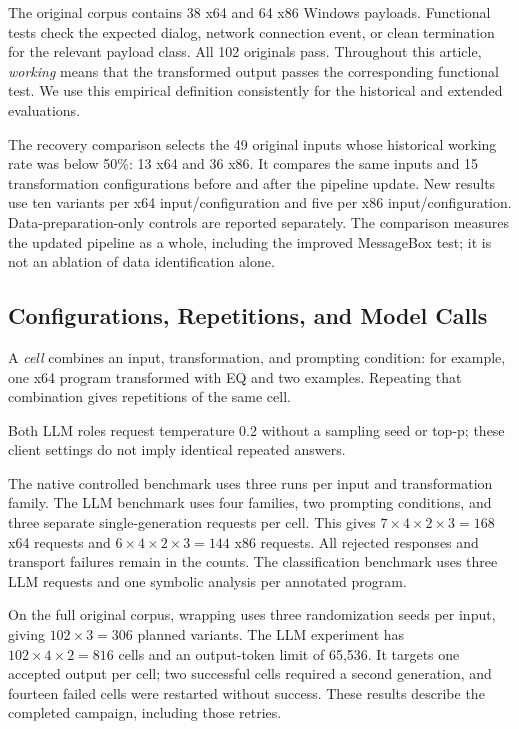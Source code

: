 The original corpus contains 38 x64 and 64 x86 Windows payloads.
Functional tests check the expected dialog, network connection event,
or clean termination for the relevant payload class. All 102 originals pass.
Throughout this article, \emph{working} means that the transformed output
passes the corresponding functional test. We use this empirical definition
consistently for the historical and extended evaluations.

The recovery comparison selects the 49 original inputs whose historical
working rate was below 50\%: 13 x64 and 36 x86. It compares the same
inputs and 15 transformation configurations before and after the
pipeline update. New results use ten variants per x64 input/configuration
and five per x86 input/configuration. Data-preparation-only controls are
reported separately. The comparison measures the updated pipeline as a
whole, including the improved MessageBox test; it is not an ablation of
data identification alone.

\subsection{Configurations, Repetitions, and Model Calls}
A \emph{cell} combines an input, transformation, and prompting condition:
for example, one x64 program transformed with EQ and two examples.
Repeating that combination gives repetitions of the same cell.

Both LLM roles request temperature 0.2 without a sampling seed or top-p;
these client settings do not imply identical repeated answers.

The native controlled benchmark uses three runs per input and transformation
family. The LLM benchmark uses four families, two prompting conditions,
and three separate single-generation requests per cell. This gives
$7\times4\times2\times3=168$ x64 requests and
$6\times4\times2\times3=144$ x86 requests. All rejected responses and
transport failures remain in the counts. The classification benchmark uses
three LLM requests and one symbolic analysis per annotated program.

On the full original corpus, wrapping uses three randomization seeds per
input, giving $102\times3=306$ planned variants. The LLM experiment has
$102\times4\times2=816$ cells and an output-token limit of 65,536.
It targets one accepted output per cell; two successful cells required a
second generation, and fourteen failed cells were restarted without success.
These results describe the completed campaign, including those retries.

